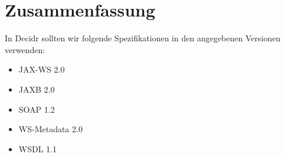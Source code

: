 \documentclass[runningheads]{llncs}
\newcommand{\decidr}{Decidr}
\begin{document}
  \label{summary}
  \section{Zusammenfassung}
  In \decidr{} sollten wir folgende Spezifikationen in den angegebenen Versionen verwenden:
  \begin{itemize}
    \item JAX-WS 2.0
    \item JAXB 2.0
    \item SOAP 1.2
    \item WS-Metadata 2.0
    \item WSDL 1.1
  \end{itemize}


  \newpage
  
  
\end{document}
